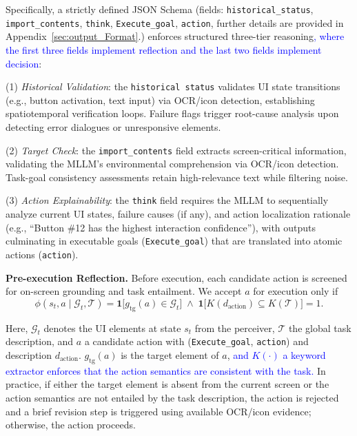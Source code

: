 \documentclass{article} %
\newcommand{\mypara}[1]{\vspace{0.4em}\noindent\textbf{#1}\hspace{0.2cm}}
\newcommand{\revise}[1]{\textcolor{blue}{#1}}
\begin{document}
Specifically, a strictly defined JSON Schema (fields: \texttt{historical\_status}, \texttt{import\_contents}, \texttt{think}, \texttt{Execute\_goal}, \texttt{action}, further details are provided in Appendix~\ref{sec:output_Format}.) enforces structured three-tier reasoning\revise{, where the first three fields implement reflection and the last two fields implement decision}:

(1) \textit{Historical Validation}: the \texttt{historical status} validates UI state transitions (e.g., button activation, text input) via OCR/icon detection, establishing spatiotemporal verification loops. Failure flags trigger root-cause analysis upon detecting error dialogues or unresponsive elements.

(2) \textit{Target Check}: the \texttt{import\_contents} field extracts screen-critical information, validating the MLLM's environmental comprehension via OCR/icon detection. Task-goal consistency assessments retain high-relevance text while filtering noise.

(3) \textit{Action Explainability}: the \texttt{think} field requires the MLLM to sequentially analyze current UI states, failure causes (if any), and action localization rationale (e.g., ``Button \#12 has the highest interaction confidence''), with outputs culminating in executable goals (\texttt{Execute\_goal}) that are translated into atomic actions (\texttt{action}).

\mypara{Pre-execution Reflection.}
Before execution, each candidate action is screened for on-screen grounding and task entailment. We accept $a$ for execution only if
\begin{equation}
\phi(s_t,a \mid \mathcal{G}_t,\mathcal{T})
=
\mathbf{1}\!\big[g_{\mathrm{tg}}(a)\in \mathcal{G}_t\big]
\;\land\;
\mathbf{1}\!\big[K(d_{\mathrm{action}})\subseteq K(\mathcal{T})\big]
= 1.
\end{equation}

Here, $\mathcal{G}_t$ denotes the UI elements at state $s_t$ from the perceiver,
$\mathcal{T}$ the global task description, and $a$ a candidate action with
(\texttt{Execute\_goal}, \texttt{action}) and description $d_{\text{action}}$.
$g_{\mathrm{tg}}(a)$ is the target element of $a$, \revise{ and $K(\cdot)$ a keyword extractor enforces that the action semantics are consistent with the task.} In practice, if either the target element is absent from the current screen or the action semantics are not entailed by the task description, the action is rejected and a brief revision step is triggered using available OCR/icon evidence; otherwise, the action proceeds.
\end{document}

